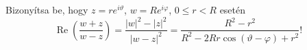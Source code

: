 \documentclass[11pt]{scrartcl}
\begin{document}
Bizonyítsa be, hogy $z = r e^{i \vartheta}$, $w = R e^{i \varphi}$,
$0 \le r < R$ esetén
\[
	\operatorname{Re} \left( \frac{w + z}{w - z} \right)
	= \frac{|w|^2 - |z|^2}{|w - z|^2}
	= \frac{R^2 - r^2}{R^2 - 2Rr \cos(\vartheta - \varphi) + r^2}!
\]
\end{document}

